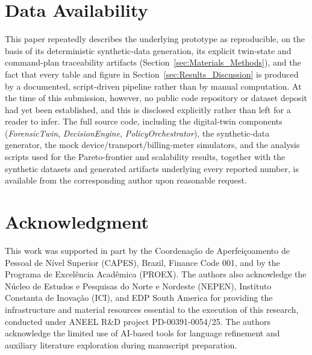 \documentclass{ieeeaccess}
\begin{document}
\section*{Data Availability}
This paper repeatedly describes the underlying prototype as reproducible, on the basis of its deterministic synthetic-data generation, its explicit twin-state and command-plan traceability artifacts (Section~\ref{sec:Materials_Methods}), and the fact that every table and figure in Section~\ref{sec:Results_Discussion} is produced by a documented, script-driven pipeline rather than by manual computation. At the time of this submission, however, no public code repository or dataset deposit had yet been established, and this is disclosed explicitly rather than left for a reader to infer. The full source code, including the digital-twin components (\textit{ForensicTwin}, \textit{DecisionEngine}, \textit{PolicyOrchestrator}), the synthetic-data generator, the mock device/transport/billing-meter simulators, and the analysis scripts used for the Pareto-frontier and scalability results, together with the synthetic datasets and generated artifacts underlying every reported number, is available from the corresponding author upon reasonable request.

\section*{Acknowledgment}
This work was supported in part by the Coordenação de Aperfeiçoamento de Pessoal de Nível Superior (CAPES), Brazil, Finance Code 001, and by the Programa de Excelência Acadêmica (PROEX). The authors also acknowledge the Núcleo de Estudos e Pesquisas do Norte e Nordeste (NEPEN), Instituto Constanta de Inovação (ICI), and EDP South America for providing the infrastructure and material resources essential to the execution of this research, conducted under ANEEL R\&D project PD-00391-0054/25. The authors acknowledge the limited use of AI-based tools for language refinement and auxiliary literature exploration during manuscript preparation.
\end{document}
